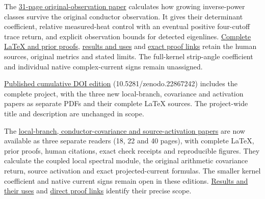 \documentclass[
]{article}
\begin{document}
The
\href{https://github.com/KokunoYumeto/zeta-function-research-reader/blob/main/workbenches/splitzero-tandem/continuations/20260921-original-observation/ORIGINAL_OBSERVATION_COMPLETE_READER.pdf}{31-page
original-observation paper} calculates how growing inverse-power classes
survive the original conductor observation. It gives their determinant
coefficient, relative measured-heat control with an eventual positive
four-cutoff trace return, and explicit observation bounds for detected
eigenlines.
\href{https://github.com/KokunoYumeto/zeta-function-research-reader/blob/main/workbenches/splitzero-tandem/continuations/20260921-original-observation/README.md}{Complete
LaTeX and prior proofs},
\href{https://github.com/KokunoYumeto/zeta-function-research-reader/blob/main/workbenches/splitzero-tandem/continuations/20260921-original-observation/RESULT_INDEX.json}{results
and uses} and
\href{https://github.com/KokunoYumeto/zeta-function-research-reader/blob/main/workbenches/splitzero-tandem/continuations/20260921-original-observation/PROOF_LINKS.json}{exact
proof links} retain the human sources, original metrics and stated
limits. The full-kernel strip-angle coefficient and individual native
complex-current signs remain unassigned.

\href{https://zenodo.org/records/22867242}{Published cumulative DOI
edition} (10.5281/zenodo.22867242) includes the complete project, with
the three new local-branch, covariance and activation papers as separate
PDFs and their complete LaTeX sources. The project-wide title and
description are unchanged in scope.

The
\href{https://github.com/KokunoYumeto/zeta-function-research-reader/blob/main/workbenches/splitzero-tandem/continuations/20260921-local-covariance-activation/README.md}{local-branch,
conductor-covariance and source-activation papers} are now available as
three separate readers (18, 22 and 40 pages), with complete LaTeX, prior
proofs, human citations, exact check receipts and reproducible figures.
They calculate the coupled local spectral module, the original
arithmetic covariance return, source activation and exact
projected-current formulas. The smaller kernel coefficient and native
current signs remain open in these editions.
\href{https://github.com/KokunoYumeto/zeta-function-research-reader/blob/main/workbenches/splitzero-tandem/continuations/20260921-local-covariance-activation/RESULT_INDEX.json}{Results
and their uses} and
\href{https://github.com/KokunoYumeto/zeta-function-research-reader/blob/main/workbenches/splitzero-tandem/continuations/20260921-local-covariance-activation/PROOF_LINKS.json}{direct
proof links} identify their precise scope.
\end{document}
